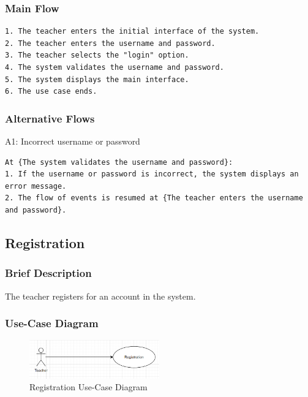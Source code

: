 \documentclass{article}
\begin{document}
\subsubsection{Main Flow}
\begin{verbatim}
1. The teacher enters the initial interface of the system.
2. The teacher enters the username and password.
3. The teacher selects the "login" option.
4. The system validates the username and password.
5. The system displays the main interface.
6. The use case ends.
\end{verbatim}

\subsubsection{Alternative Flows}
A1: Incorrect username or password
\begin{verbatim}
At {The system validates the username and password}:
1. If the username or password is incorrect, the system displays an error message.
2. The flow of events is resumed at {The teacher enters the username and password}.
\end{verbatim}


\subsection{Registration}
\subsubsection{Brief Description}
The teacher registers for an account in the system.

\subsubsection{Use-Case Diagram}
\begin{figure}[h]
    \centering
    \includegraphics[width=0.5\textwidth]{registration.png}
    \caption{Registration Use-Case Diagram}
\end{figure}
\end{document}
